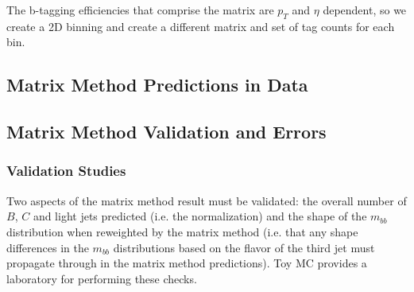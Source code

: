 The b-tagging efficiencies that comprise the matrix are $p_T$ and $\eta$ dependent, so we create a 2D binning and create a different matrix and set of tag counts for each bin.  

\subsection{Matrix Method Predictions in Data}



\subsection{Matrix Method Validation and Errors}
\subsubsection{Validation Studies}
Two aspects of the matrix method result must be validated: the overall number of $B$, $C$ and light jets predicted (i.e. the normalization) and the shape of the $m_{bb}$ distribution when reweighted by the matrix method (i.e. that any shape differences in the $m_{bb}$ distributions based on the flavor of the third jet must propagate through in the matrix method predictions).  Toy MC provides a laboratory for performing these checks.  

